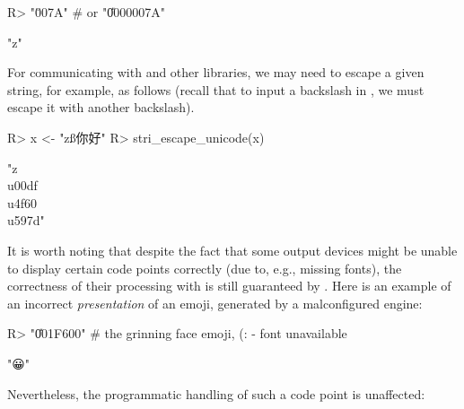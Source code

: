 \documentclass[nojss]{jss}
\begin{document}
\begin{Schunk}
\begin{Sinput}
R> "\u007A"  # or "\U0000007A"
\end{Sinput}
\begin{Soutput}
[1] "z"
\end{Soutput}
\end{Schunk}


For communicating with  and other libraries,
we may need to escape a given string, for example, as follows
(recall that to input a backslash in ,
we must escape it with another backslash).

\begin{Schunk}
\begin{Sinput}
R> x <- "zß你好"
R> stri_escape_unicode(x)
\end{Sinput}
\begin{Soutput}
[1] "z\\u00df\\u4f60\\u597d"
\end{Soutput}
\end{Schunk}



\bigskip
It is worth noting that despite the fact that some output devices
might be unable to display certain code points correctly
(due to, e.g., missing fonts), the correctness of their
processing with  is still guaranteed by .
Here is an example of an incorrect \textit{presentation} of an emoji,
generated by a malconfigured \XeLaTeX{} engine:

\begin{Schunk}
\begin{Sinput}
R> "\U001F600" # the grinning face emoji, (:               - font unavailable
\end{Sinput}
\begin{Soutput}
[1] "😀"
\end{Soutput}
\end{Schunk}

Nevertheless, the programmatic handling of such a code point is unaffected:
\end{document}
